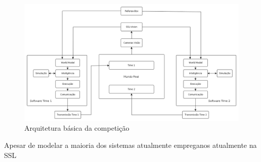 \begin{landscape}
  \begin{figure}[thpb]
    \centering
    \includegraphics[width=20cm]{imgs/arquitetura_ssl}
    \caption{Arquitetura básica da competição}
    \label{arquitetura_ssl}
  \end{figure}
\end{landscape}


Apesar de modelar a maioria dos sistemas atualmente empreganos atualmente na
SSL